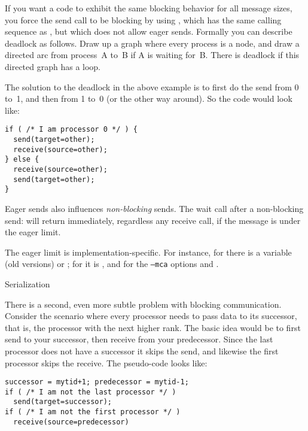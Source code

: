 If you want a code to exhibit the same blocking behavior for  all message sizes,
you force the send call to be blocking by using
, which has the same calling sequence as ,
but which does not allow eager sends.
%
%
Formally you can describe deadlock as follows. Draw up a graph where
every process is a node, and draw a directed arc from process~A to~B if
A is waiting for~B. There is deadlock if this directed graph has a
loop.

The solution to the deadlock in the above example is to first do the
send from 0 to~1, and then from 1 to~0 (or the other way around). So
the code would look like:
\begin{lstlisting}
if ( /* I am processor 0 */ ) {
  send(target=other);
  receive(source=other);
} else {
  receive(source=other);
  send(target=other);
}
\end{lstlisting}

Eager sends also influences
\emph{non-blocking} sends.
The wait call after a non-blocking send:
%
%
will return immediately, regardless any receive call,
if the message is under the eager limit.

The eager limit is implementation-specific.
For instance,
for  there is a variable
 (old versions) or ;
for  it is ,
and for  the
\texttt{--mca} options  and
.


 {Serialization}
\label{sec:serialization}

There is a second, even more subtle problem with blocking
communication. Consider the scenario where every processor needs to
pass data to its successor, that is, the processor with the next
higher rank. The basic idea would be to first send to your successor,
then receive from your predecessor. Since the last processor does not
have a successor it skips the send, and likewise the first processor
skips the receive. The pseudo-code looks like:
\begin{lstlisting}
successor = mytid+1; predecessor = mytid-1;
if ( /* I am not the last processor */ )
  send(target=successor);
if ( /* I am not the first processor */ )
  receive(source=predecessor)
\end{lstlisting}

